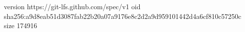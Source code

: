 version https://git-lfs.github.com/spec/v1
oid sha256:a9d8eab51d3087fab22b20a07a9176e8c2d2a9d959101442d4a6cf810c57250c
size 174916
